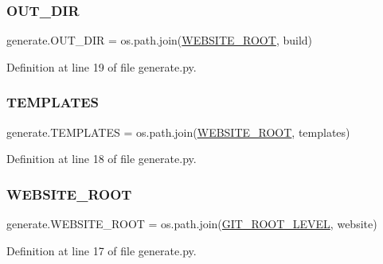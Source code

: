 \mbox{\label{namespacegenerate_a6883b4bdece5baaaaf8a166563dd789e}} 
\subsubsection{\texorpdfstring{O\+U\+T\+\_\+\+D\+IR}{OUT\_DIR}}
{\footnotesize\ttfamily generate.\+O\+U\+T\+\_\+\+D\+IR = os.\+path.\+join(\hyperlink{namespacegenerate_a3cb5a2707122c53bf81da4c33e3f65c4}{W\+E\+B\+S\+I\+T\+E\+\_\+\+R\+O\+OT}, \textquotesingle{}build\textquotesingle{})}



Definition at line 19 of file generate.\+py.

\mbox{\label{namespacegenerate_ae98641ac5f9b63366f1c9b644d0a7548}} 
\subsubsection{\texorpdfstring{T\+E\+M\+P\+L\+A\+T\+ES}{TEMPLATES}}
{\footnotesize\ttfamily generate.\+T\+E\+M\+P\+L\+A\+T\+ES = os.\+path.\+join(\hyperlink{namespacegenerate_a3cb5a2707122c53bf81da4c33e3f65c4}{W\+E\+B\+S\+I\+T\+E\+\_\+\+R\+O\+OT}, \textquotesingle{}templates\textquotesingle{})}



Definition at line 18 of file generate.\+py.

\mbox{\label{namespacegenerate_a3cb5a2707122c53bf81da4c33e3f65c4}} 
\subsubsection{\texorpdfstring{W\+E\+B\+S\+I\+T\+E\+\_\+\+R\+O\+OT}{WEBSITE\_ROOT}}
{\footnotesize\ttfamily generate.\+W\+E\+B\+S\+I\+T\+E\+\_\+\+R\+O\+OT = os.\+path.\+join(\hyperlink{namespacegenerate_afea39d363835652697e0616074816686}{G\+I\+T\+\_\+\+R\+O\+O\+T\+\_\+\+L\+E\+V\+EL}, \textquotesingle{}website\textquotesingle{})}



Definition at line 17 of file generate.\+py.

